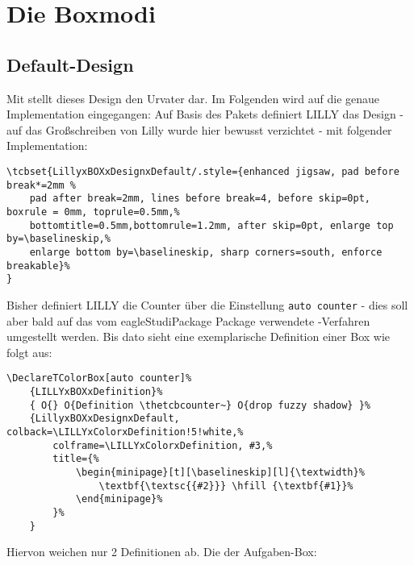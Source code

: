 \begin{bemerkung}
    
\end{bemerkung}

\section{Die Boxmodi}
\subsection{Default-Design}
Mit  stellt dieses Design den Urvater dar. Im Folgenden wird auf die genaue Implementation eingegangen:\newline
Auf Basis des Pakets  definiert LILLY das Design  - auf das Großschreiben von Lilly wurde hier bewusst verzichtet - mit folgender Implementation:
{\begin{lstlisting}[language=lLatex]
\tcbset{LillyxBOXxDesignxDefault/.style={enhanced jigsaw, pad before break*=2mm %
    pad after break=2mm, lines before break=4, before skip=0pt, boxrule = 0mm, toprule=0.5mm,%
    bottomtitle=0.5mm,bottomrule=1.2mm, after skip=0pt, enlarge top by=\baselineskip,%
    enlarge bottom by=\baselineskip, sharp corners=south, enforce breakable}%
}
\end{lstlisting}}
Bisher definiert LILLY die Counter über die Einstellung \verb|auto counter| - dies soll aber bald auf das vom eagleStudiPackage Package verwendete -Verfahren umgestellt werden. Bis dato sieht eine exemplarische Definition einer Box wie folgt aus:
{\begin{lstlisting}[language=lLatex]
\DeclareTColorBox[auto counter]%
    {LILLYxBOXxDefinition}%
    { O{} O{Definition \thetcbcounter~} O{drop fuzzy shadow} }%
    {LillyxBOXxDesignxDefault, colback=\LILLYxColorxDefinition!5!white,%
        colframe=\LILLYxColorxDefinition, #3,%
        title={%
            \begin{minipage}[t][\baselineskip][l]{\textwidth}%
                \textbf{\textsc{{#2}}} \hfill {\textbf{#1}}%
            \end{minipage}%
        }%
    }
\end{lstlisting}}
Hiervon weichen nur 2 Definitionen ab. Die der Aufgaben-Box:

